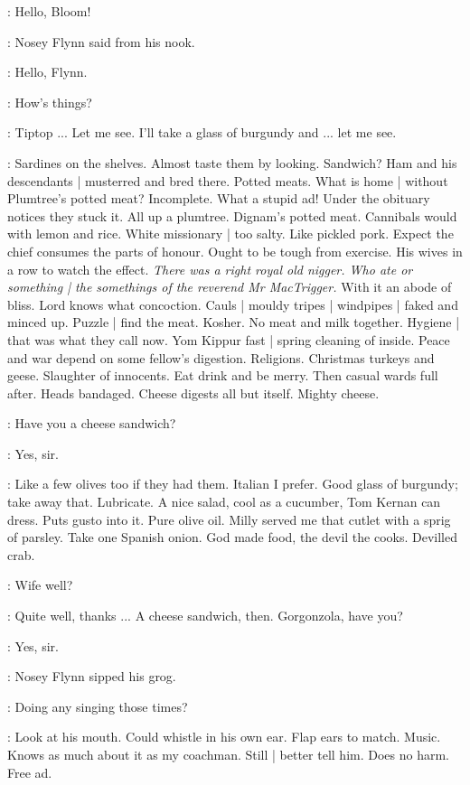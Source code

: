 \nosey:
Hello, Bloom!

:
Nosey Flynn said from his nook.

\Bloom:
Hello,
Flynn.

\nosey:
How's things?

\Bloom:
Tiptop ...
Let me see.
I'll take a glass of burgundy and ...
let me see.

\BloomInt:
Sardines on the shelves.
Almost taste them by looking.
Sandwich?
Ham and his descendants |
musterred and bred there.
Potted meats.
What is home |
without Plumtree's potted meat?
Incomplete.
What a stupid ad!
Under the obituary notices they stuck it.
All up a plumtree.
Dignam's potted meat.
Cannibals would with lemon and rice.
White missionary |
too salty.
Like pickled pork.
Expect the chief consumes the parts of honour.
Ought to be tough from exercise.
His wives in a row to watch the effect.
\emph{There was a right royal old nigger.
Who ate or something |
the somethings of the reverend Mr MacTrigger.}
With it an abode of bliss.
Lord knows what concoction.
Cauls |
mouldy tripes |
windpipes |
faked and minced up.
Puzzle |
find the meat.
Kosher.
No meat and milk together.
Hygiene |
that was what they call now.
Yom Kippur fast |
spring cleaning of inside.
Peace and war depend on some fellow's digestion.
Religions.
Christmas turkeys and geese.
Slaughter of innocents.
Eat drink and be merry.
Then casual wards full after.
Heads bandaged.
Cheese digests all but itself.
Mighty cheese.

\Bloom:
Have you a cheese sandwich?

\curate:
Yes, sir.

\BloomInt:
Like a few olives too if they had them.
Italian I prefer.
Good glass of burgundy;
take away that.
Lubricate.
A nice salad,
cool as a cucumber,
Tom Kernan can dress.
Puts gusto into it.
Pure olive oil.
Milly served me that cutlet with a sprig of parsley.
Take one Spanish onion.
God made food,
the devil the cooks.
Devilled crab.

\nosey:
Wife well?

\Bloom:
Quite well,
thanks ...
A cheese sandwich, then.
Gorgonzola,
have you?

\curate:
Yes, sir.

:
Nosey Flynn sipped his grog.

\nosey:
Doing any singing those times?

\BloomInt:
Look at his mouth.
Could whistle in his own ear.
Flap ears to match.
Music.
Knows as much about it as my coachman.
Still |
better tell him.
Does no harm.
Free ad.

